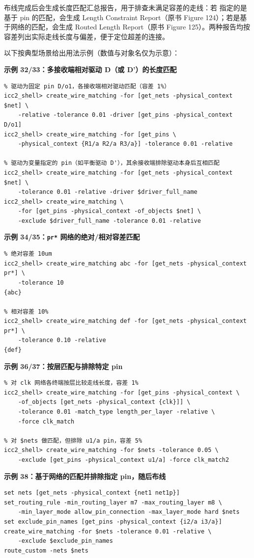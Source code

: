 布线完成后会生成长度匹配汇总报告，用于排查未满足容差的走线：若  指定的是基于 pin 的匹配，会生成 Length Constraint Report（原书 Figure 124）；若是基于网络的匹配，会生成 Routed Length Report（原书 Figure 125）。两种报告均按容差列出实际走线长度与偏差，便于定位超差的连接。

以下按典型场景给出用法示例（数值与对象名仅为示意）：

\textbf{示例 32/33：多接收端相对驱动 D（或 D'）的长度匹配}
\begin{lstlisting}
% 驱动为固定 pin D/o1，各接收端相对驱动匹配（容差 1%）
icc2_shell> create_wire_matching -for [get_nets -physical_context $net] \
    -relative -tolerance 0.01 -driver [get_pins -physical_context D/o1]
icc2_shell> create_wire_matching -for [get_pins \
    -physical_context {R1/a R2/a R3/a}] -tolerance 0.01 -relative

% 驱动为变量指定的 pin（如平衡驱动 D'），其余接收端排除驱动本身后互相匹配
icc2_shell> create_wire_matching -for [get_nets -physical_context $net] \
    -tolerance 0.01 -relative -driver $driver_full_name
icc2_shell> create_wire_matching \
    -for [get_pins -physical_context -of_objects $net] \
    -exclude $driver_full_name -tolerance 0.01 -relative
\end{lstlisting}

\textbf{示例 34/35：\texttt{pr*} 网络的绝对/相对容差匹配}
\begin{lstlisting}
% 绝对容差 10um
icc2_shell> create_wire_matching abc -for [get_nets -physical_context pr*] \
    -tolerance 10
{abc}

% 相对容差 10%
icc2_shell> create_wire_matching def -for [get_nets -physical_context pr*] \
    -tolerance 0.10 -relative
{def}
\end{lstlisting}

\textbf{示例 36/37：按层匹配与排除特定 pin}
\begin{lstlisting}
% 对 clk 网络各终端按层比较走线长度，容差 1%
icc2_shell> create_wire_matching -for [get_pins -physical_context \
    -of_objects [get_nets -physical_context {clk}]] \
    -tolerance 0.01 -match_type length_per_layer -relative \
    -force clk_match

% 对 $nets 做匹配，但排除 u1/a pin，容差 5%
icc2_shell> create_wire_matching -for $nets -tolerance 0.05 \
    -exclude [get_pins -physical_context u1/a] -force clk_match2
\end{lstlisting}

\textbf{示例 38：基于网络的匹配并排除指定 pin，随后布线}
\begin{lstlisting}
set nets [get_nets -physical_context {net1 net1p}]
set_routing_rule -min_routing_layer m7 -max_routing_layer m8 \
    -min_layer_mode allow_pin_connection -max_layer_mode hard $nets
set exclude_pin_names [get_pins -physical_context {i2/a i3/a}]
create_wire_matching -for $nets -tolerance 0.01 -relative \
    -exclude $exclude_pin_names
route_custom -nets $nets
\end{lstlisting}

